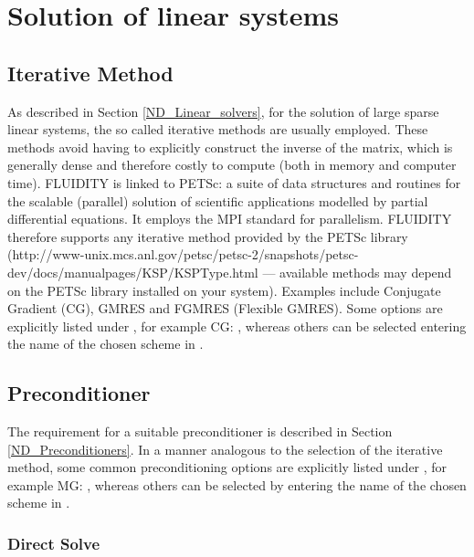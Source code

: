 \section{Solution of linear systems}\label{sec:Solve}

\subsection{Iterative Method}
As described in Section \ref{ND_Linear_solvers}, for the solution of large sparse linear systems, the so called iterative methods are usually employed. These methods avoid having to explicitly construct the inverse of the matrix, which is generally dense and therefore costly to compute (both in memory and computer time). FLUIDITY is linked to PETSc: a suite of data structures and routines for the scalable (parallel) solution of scientific applications modelled by partial differential equations.  It employs the MPI standard for parallelism. FLUIDITY therefore supports any iterative method provided by the PETSc library (http://www-unix.mcs.anl.gov/petsc/petsc-2/snapshots/petsc-dev/docs/manualpages/KSP/KSPType.html --- available methods may depend on the PETSc library installed on your system). Examples include Conjugate Gradient (CG), GMRES and FGMRES (Flexible GMRES). Some options are explicitly listed under , for example CG: , whereas 
others can be selected entering the name of the chosen scheme in .

\subsection{Preconditioner}

The requirement for a suitable preconditioner is described in Section \ref{ND_Preconditioners}. In a manner analogous to the selection of the iterative method, some common preconditioning options are explicitly listed under , for example MG: , whereas others can be selected by entering the name of the chosen scheme in . 

\subsubsection{Direct Solve}

